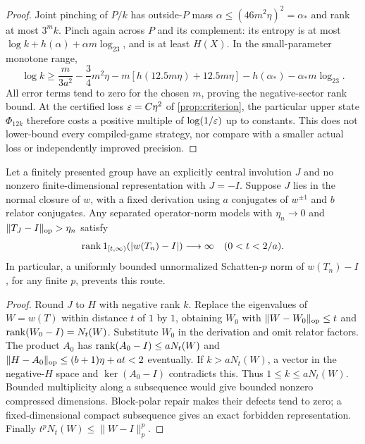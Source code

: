 \begin{proof}
Joint pinching of $P/k$ has outside-$P$ mass $\alpha\le(46m^2\eta)^2=\alpha_*$ and rank at most $3^mk$. Pinch again across $P$ and its complement: its entropy is at most $\log k+h(\alpha)+\alpha m\log_23$, and is at least $H(X)$. In the small-parameter monotone range,
\[
 \log k\ge\frac m{3a^2}-\frac34m^2\eta
 -m[h(12.5m\eta)+12.5m\eta]-h(\alpha_*)-\alpha_*m\log_23.
\]
All error terms tend to zero for the chosen $m$, proving the negative-sector rank bound. At the certified loss $\varepsilon=C\eta^2$ of \cref{prop:criterion}, the particular upper state $\Phi_{12k}$ therefore costs a positive multiple of $\log(1/\varepsilon)$ up to constants. This does not lower-bound every compiled-game strategy, nor compare with a smaller actual loss or independently improved precision.
\end{proof}

\begin{proposition}\label{prop:spectral-multiplicity}
Let a finitely presented group have an explicitly central involution $J$ and no nonzero finite-dimensional representation with $J=-I$. Suppose $J$ lies in the normal closure of $w$, with a fixed derivation using $a$ conjugates of $w^{\pm1}$ and $b$ relator conjugates. Any separated operator-norm models with $\eta_n\to0$ and $\lVert T_J-I\rVert_{\mathrm{op}}>\eta_n$ satisfy
\[
 \operatorname{rank}1_{[t,\infty)}(|w(T_n)-I|)\longrightarrow\infty\quad(0<t<2/a).
\]
In particular, a uniformly bounded unnormalized Schatten-$p$ norm of $w(T_n)-I$, for any finite $p$, prevents this route.
\end{proposition}
\begin{proof}
Round $J$ to $H$ with negative rank $k$. Replace the eigenvalues of $W=w(T)$ within distance $t$ of $1$ by $1$, obtaining $W_0$ with $\lVert W-W_0\rVert_{\mathrm{op}}\le t$ and $\operatorname{rank}(W_0-I)=N_t(W)$. Substitute $W_0$ in the derivation and omit relator factors. The product $A_0$ has $\operatorname{rank}(A_0-I)\le aN_t(W)$ and $\lVert H-A_0\rVert_{\mathrm{op}}\le(b+1)\eta+at<2$ eventually. If $k>aN_t(W)$, a vector in the negative-$H$ space and $\ker(A_0-I)$ contradicts this. Thus $1\le k\le aN_t(W)$. Bounded multiplicity along a subsequence would give bounded nonzero compressed dimensions. Block-polar repair makes their defects tend to zero; a fixed-dimensional compact subsequence gives an exact forbidden representation. Finally $t^pN_t(W)\le\|W-I\|_p^p$.
\end{proof}

